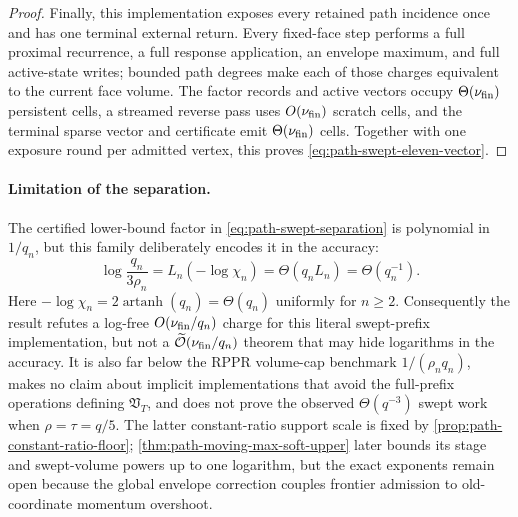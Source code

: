 \begin{proof}
Finally, this implementation exposes every retained path incidence once and
has one terminal external return.  Every fixed-face step performs a full
proximal recurrence, a full response application, an envelope maximum, and
full active-state writes; bounded path degrees make each of those charges
equivalent to the current face volume.  The factor records and active vectors
occupy $\Theta(\nu_{\rm fin})$ persistent cells, a streamed reverse pass uses
$O(\nu_{\rm fin})$ scratch cells, and the terminal sparse vector and
certificate emit $\Theta(\nu_{\rm fin})$ cells.  Together with one exposure
round per admitted vertex, this proves
\cref{eq:path-swept-eleven-vector}.
\end{proof}

\paragraph{Limitation of the separation.}
The certified lower-bound factor in \cref{eq:path-swept-separation} is
polynomial in $1/q_n$, but this family deliberately encodes it in the
accuracy:
\begin{equation}
 \log\frac{q_n}{3\rho_n}
 =L_n(-\log\chi_n)
 =\Theta(q_nL_n)
 =\Theta(q_n^{-1}).
 \label{eq:path-swept-log-accuracy}
\end{equation}
Here $-\log\chi_n=2\operatorname{artanh}(q_n)=\Theta(q_n)$ uniformly for
$n\geq2$.
Consequently the result refutes a log-free
$O(\nu_{\rm fin}/q_n)$ charge for this literal swept-prefix implementation,
but not a $\widetilde{\mathcal{O}}(\nu_{\rm fin}/q_n)$ theorem that may hide logarithms in the
accuracy.  It is also far below the RPPR volume-cap benchmark
$1/(\rho_nq_n)$, makes no claim about implicit implementations that avoid the
full-prefix operations defining $\mathfrak V_T$, and does not prove the
observed $\Theta(q^{-3})$ swept work when $\rho=\tau=q/5$.  The latter
constant-ratio support scale is fixed by
\cref{prop:path-constant-ratio-floor};
\cref{thm:path-moving-max-soft-upper} later bounds its stage and swept-volume
powers up to one logarithm, but the exact exponents remain open because the
global envelope correction couples frontier admission to old-coordinate
momentum overshoot.
